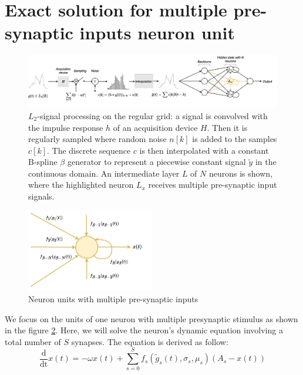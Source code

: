 \documentclass[journal]{IEEEtran}
\begin{document}
\onecolumn

\section{Exact solution for multiple pre-synaptic inputs neuron unit}

\begin{figure}[h]
\centering
\includegraphics[width=1\textwidth]{general_pipeline.png} 
    \caption{ $L_2$-signal processing on the regular grid: a signal is convolved with the impulse response $h$ of an acquisition device $H$. Then it is regularly sampled where random noise $n[k]$ is added to the samples $c[k]$. The discrete sequence $c$ is then interpolated with a constant B-spline $\beta$ generator to represent a piecewise constant signal $\tilde y$ in the continuous domain. An intermediate layer $L$ of $N$ neurons is shown, where the highlighted neuron $L_x$ receives multiple pre-synaptic input signals.}
    \label{fig: General pipeline }
\end{figure}

\begin{figure}[h]
\centering
\includegraphics[width=0.5\textwidth]{unit.png} 
    \caption{Neuron units with multiple pre-synaptic inputs}
    \label{fig:units}
\end{figure}




We focus on the units of one neuron with multiple presynaptic stimulus as shown in the figure \ref{fig:units}.
Here, we will solve the neuron's dynamic equation involving a total number of $S$ synapses. The equation is derived as follow:
\begin{equation}
\frac{\mathrm{d}}{\mathrm{dt}}x(t)=-\omega x(t) + \sum_{s=0}^{S}f_s(\tilde{g}_s(t), \sigma_s, \mu_s)(A_s-x(t))
\label{eq: exact solution several synapses}
\end{equation}
\end{document}
